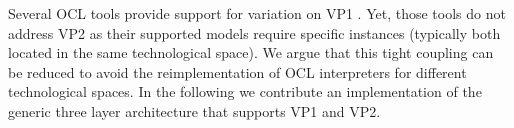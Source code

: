 Several OCL tools provide
support for variation on VP1
\cite{WWW:MDT,akehurst2003ocl,WWW:dresdenOCL,kolovos2008detecting}. 
Yet, those tools do not address VP2 as their supported models require specific 
instances (typically both located in the same technological space).
We argue that this tight coupling can be reduced to avoid the
reimplementation of OCL interpreters for different technological spaces.
In the following we contribute an implementation of the generic three layer
architecture that supports VP1 and VP2.

	
	
	
	

%
%	
